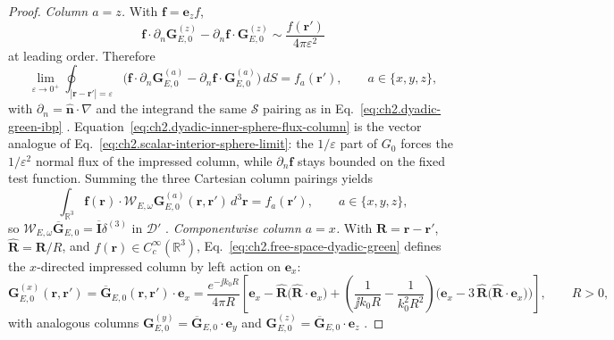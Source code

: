 \begin{proof}
\emph{Column $a=z$.}
With $\mathbf{f}=\mathbf{e}_z f$,
\[
\mathbf{f}\cdot\partial_n\mathbf{G}_{E,0}^{(z)}
-\partial_n\mathbf{f}\cdot\mathbf{G}_{E,0}^{(z)}
\sim
\frac{f(\mathbf{r}')}{4\pi\varepsilon^{2}}
\]
at leading order.
Therefore
\begin{equation}
\label{eq:ch2.dyadic-inner-sphere-flux-column}
\lim_{\varepsilon\to 0^{+}}
\oint_{|\mathbf{r}-\mathbf{r}'|=\varepsilon}
\Big(\mathbf{f}\cdot\partial_{n}\mathbf{G}_{E,0}^{(a)}
-\partial_{n}\mathbf{f}\cdot\mathbf{G}_{E,0}^{(a)}\Big)\,dS
=f_a(\mathbf{r}'),
\qquad a\in\{x,y,z\},
\end{equation}
with $\partial_{n}=\hat{\mathbf{n}}\cdot\nabla$ and the integrand the same $\boldsymbol{\mathcal{S}}$ pairing as in
Eq.~\eqref{eq:ch2.dyadic-green-ibp} \cite{jackson1999,stratton1941}.
Equation~\eqref{eq:ch2.dyadic-inner-sphere-flux-column} is the vector analogue of
Eq.~\eqref{eq:ch2.scalar-interior-sphere-limit}: the $1/\varepsilon$ part of $G_0$ forces the $1/\varepsilon^2$
normal flux of the impressed column, while $\partial_{n}\mathbf{f}$ stays bounded on the fixed test function.
Summing the three Cartesian column pairings yields
\begin{equation}
\label{eq:ch2.dyadic-test-pairing-columns}
\int_{\mathbb{R}^{3}}\mathbf{f}(\mathbf{r})\cdot\mathcal{W}_{E,\omega}\mathbf{G}_{E,0}^{(a)}(\mathbf{r},\mathbf{r}')\,d^{3}\mathbf{r}
=f_a(\mathbf{r}'),
\qquad a\in\{x,y,z\},
\end{equation}
so $\mathcal{W}_{E,\omega}\overline{\mathbf{G}}_{E,0}=\overline{\mathbf{I}}\delta^{(3)}$ in $\mathcal{D}'$ \cite{stratton1941,jackson1999}.
\emph{Componentwise column $a=x$.} With $\mathbf{R}=\mathbf{r}-\mathbf{r}'$, $\widehat{\mathbf{R}}=\mathbf{R}/R$, and
$f(\mathbf{r})\in C_c^{\infty}(\mathbb{R}^{3})$, Eq.~\eqref{eq:ch2.free-space-dyadic-green} defines the $x$-directed
impressed column by left action on $\mathbf{e}_x$:
\begin{equation}
\label{eq:ch2.dyadic-column-x-explicit}
\mathbf{G}_{E,0}^{(x)}(\mathbf{r},\mathbf{r}')
=
\overline{\mathbf{G}}_{E,0}(\mathbf{r},\mathbf{r}')\cdot\mathbf{e}_x
=
\frac{e^{-\jj k_0 R}}{4\pi R}
\left[
\mathbf{e}_x-\widehat{\mathbf{R}}\big(\widehat{\mathbf{R}}\cdot\mathbf{e}_x\big)
+\left(\frac{1}{\jj k_0 R}-\frac{1}{k_0^{2}R^{2}}\right)
\Big(\mathbf{e}_x-3\,\widehat{\mathbf{R}}\big(\widehat{\mathbf{R}}\cdot\mathbf{e}_x\big)\Big)
\right],
\qquad R>0,
\end{equation}
with analogous columns $\mathbf{G}_{E,0}^{(y)}=\overline{\mathbf{G}}_{E,0}\cdot\mathbf{e}_y$ and
$\mathbf{G}_{E,0}^{(z)}=\overline{\mathbf{G}}_{E,0}\cdot\mathbf{e}_z$ \cite{stratton1941,tai1994}.

\end{proof}
